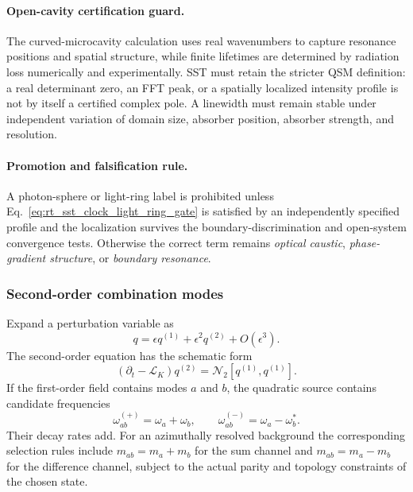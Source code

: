         \paragraph{Open-cavity certification guard.}
        The curved-microcavity calculation uses real wavenumbers to capture resonance
        positions and spatial structure, while finite lifetimes are determined by
        radiation loss numerically and experimentally.  SST must retain the stricter
        QSM definition: a real determinant zero, an FFT peak, or a spatially localized
        intensity profile is not by itself a certified complex pole.  A linewidth must
        remain stable under independent variation of domain size, absorber position,
        absorber strength, and resolution.

        \paragraph{Promotion and falsification rule.}
        A photon-sphere or light-ring label is prohibited unless
        Eq.~\eqref{eq:rt_sst_clock_light_ring_gate} is satisfied by an independently
        specified profile and the localization survives the boundary-discrimination and
        open-system convergence tests.  Otherwise the correct term remains
        \emph{optical caustic}, \emph{phase-gradient structure}, or
        \emph{boundary resonance}.

    \subsubsection*{Second-order combination modes}

        Expand a perturbation variable as
        \begin{equation}
            q
            =
            \epsilon q^{(1)}
            +
            \epsilon^2q^{(2)}
            +
            O(\epsilon^3).
        \end{equation}
        The second-order equation has the schematic form
        \begin{equation}
            \left(
                \partial_t-\mathcal L_K
            \right)q^{(2)}
            =
            \mathcal N_2
            \left[
                q^{(1)},q^{(1)}
            \right].
            \label{eq:rt_qss_second_order_equation}
        \end{equation}
        If the first-order field contains modes \(a\) and \(b\), the quadratic source
        contains candidate frequencies
        \begin{equation}
            \omega_{ab}^{(+)}
            =
            \omega_a+\omega_b,
            \qquad
            \omega_{ab}^{(-)}
            =
            \omega_a-\omega_b^\ast.
            \label{eq:rt_qss_combination_frequencies}
        \end{equation}
        Their decay rates add.  For an azimuthally resolved background the corresponding
        selection rules include \(m_{ab}=m_a+m_b\) for the sum channel and
        \(m_{ab}=m_a-m_b\) for the difference channel, subject to the actual parity and
        topology constraints of the chosen state.

